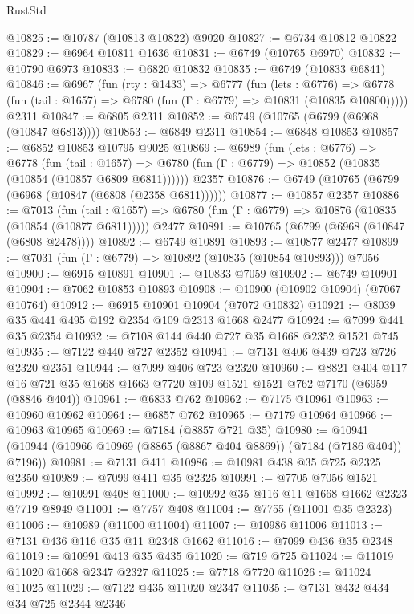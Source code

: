 \begin{lexlean}{RustStd}
\begin{coremodule}
@10825 := @10787 (@10813 @10822) @9020
@10827 := @6734 @10812 @10822
@10829 := @6964 @10811 @1636
@10831 := @6749 (@10765 @6970)
@10832 := @10790 @6973
@10833 := @6820 @10832
@10835 := @6749 (@10833 @6841)
@10846 := @6967
    (fun (rty : @1433) =>
    @6777
      (fun (lets : @6776) =>
      @6778 (fun (tail : @1657) => @6780 (fun (Γ : @6779) => @10831 (@10835 @10800)))))
    @2311
@10847 := @6805 @2311
@10852 := @6749 (@10765 (@6799 (@6968 (@10847 @6813))))
@10853 := @6849 @2311
@10854 := @6848 @10853
@10857 := @6852 @10853 @10795 @9025
@10869 := @6989
    (fun (lets : @6776) =>
    @6778
      (fun (tail : @1657) =>
      @6780 (fun (Γ : @6779) => @10852 (@10835 (@10854 (@10857 @6809 @6811))))))
    @2357
@10876 := @6749 (@10765 (@6799 (@6968 (@10847 (@6808 (@2358 @6811))))))
@10877 := @10857 @2357
@10886 := @7013
    (fun (tail : @1657) => @6780 (fun (Γ : @6779) => @10876 (@10835 (@10854 (@10877 @6811)))))
    @2477
@10891 := @10765 (@6799 (@6968 (@10847 (@6808 @2478))))
@10892 := @6749 @10891
@10893 := @10877 @2477
@10899 := @7031 (fun (Γ : @6779) => @10892 (@10835 (@10854 @10893))) @7056
@10900 := @6915 @10891
@10901 := @10833 @7059
@10902 := @6749 @10901
@10904 := @7062 @10853 @10893
@10908 := @10900 (@10902 @10904) (@7067 @10764)
@10912 := @6915 @10901 @10904 (@7072 @10832)
@10921 := @8039 @35 @441 @495 @192 @2354 @109 @2313 @1668 @2477
@10924 := @7099 @441 @35 @2354
@10932 := @7108 @144 @440 @727 @35 @1668 @2352 @1521 @745
@10935 := @7122 @440 @727 @2352
@10941 := @7131 @406 @439 @723 @726 @2320 @2351
@10944 := @7099 @406 @723 @2320
@10960 := @8821
    @404
    @117
    @16
    @721
    @35
    @1668
    @1663
    @7720
    @109
    @1521
    @1521
    @762
    @7170
    (@6959 (@8846 @404))
@10961 := @6833 @762
@10962 := @7175 @10961
@10963 := @10960 @10962
@10964 := @6857 @762
@10965 := @7179 @10964
@10966 := @10963 @10965
@10969 := @7184 (@8857 @721 @35)
@10980 := @10941 (@10944 (@10966 @10969 (@8865 (@8867 @404 @8869)) (@7184 (@7186 @404)) @7196))
@10981 := @7131 @411
@10986 := @10981 @438 @35 @725 @2325 @2350
@10989 := @7099 @411 @35 @2325
@10991 := @7705 @7056 @1521
@10992 := @10991 @408
@11000 := @10992 @35 @116 @11 @1668 @1662 @2323 @7719 @8949
@11001 := @7757 @408
@11004 := @7755 (@11001 @35 @2323)
@11006 := @10989 (@11000 @11004)
@11007 := @10986 @11006
@11013 := @7131 @436 @116 @35 @11 @2348 @1662
@11016 := @7099 @436 @35 @2348
@11019 := @10991 @413 @35 @435
@11020 := @719 @725
@11024 := @11019 @11020 @1668 @2347 @2327
@11025 := @7718 @7720
@11026 := @11024 @11025
@11029 := @7122 @435 @11020 @2347
@11035 := @7131 @432 @434 @34 @725 @2344 @2346

\end{coremodule}
\end{lexlean}
